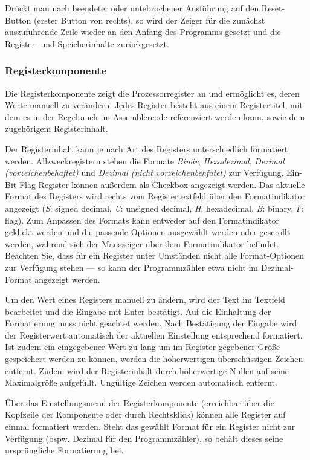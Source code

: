 Drückt man nach beendeter oder untebrochener Ausführung auf den Reset-Button (erster
Button von rechts), so wird der Zeiger für die zunächst auszuführende Zeile wieder
an den Anfang des Programms gesetzt und die Register- und Speicherinhalte zurückgesetzt.



\subsubsection{Registerkomponente}
Die Registerkomponente zeigt die Prozessorregister an und ermöglicht es, deren Werte manuell zu verändern. Jedes Register besteht aus einem Registertitel, mit dem es in der Regel auch im Assemblercode referenziert werden kann, sowie dem zugehörigem Registerinhalt.

Der Registerinhalt kann je nach Art des Registers unterschiedlich formatiert werden. Allzweckregistern stehen die Formate \textit{Binär}, \textit{Hexadezimal}, \textit{Dezimal (vorzeichenbehaftet)} und \textit{Dezimal (nicht vorzeichenbehfatet)} zur Verfügung. Ein-Bit Flag-Register können außerdem als Checkbox angezeigt werden.
Das aktuelle Format des Registers wird rechts vom Registertextfeld über den Formatindikator angezeigt (\textit{S}: signed decimal, \textit{U}: unsigned decimal, \textit{H}: hexadecimal, \textit{B}: binary, \textit{F}: flag). Zum Anpassen des Formats kann entweder auf den Formatindikator geklickt werden und die passende Optionen ausgewählt werden oder gescrollt werden, während sich der Mauszeiger über dem Formatindikator befindet. Beachten Sie, dass für ein Register unter Umständen nicht alle Format-Optionen zur Verfügung stehen --- so kann der Programmzähler etwa nicht im Dezimal-Format angezeigt werden.

Um den Wert eines Registers manuell zu ändern, wird der Text im Textfeld bearbeitet und die Eingabe mit Enter bestätigt. Auf die Einhaltung der Formatierung muss nicht geachtet werden. Nach Bestätigung der Eingabe wird der Registerwert automatisch der aktuellen Einstellung entsprechend formatiert. Ist zudem ein eingegebener Wert zu lang um im Register gegebener Größe gespeichert werden zu können, werden die höherwertigen überschüssigen Zeichen entfernt. Zudem wird der Registerinhalt durch höherwertige Nullen auf seine Maximalgröße aufgefüllt. Ungültige Zeichen werden automatisch entfernt.

Über das Einstellungsmenü der Registerkomponente (erreichbar über die Kopfzeile der Komponente oder durch Rechtsklick) können alle Register auf einmal formatiert werden. Steht das gewählt Format für ein Register nicht zur Verfügung (bspw. Dezimal für den Programmzähler), so behält dieses seine ursprüngliche Formatierung bei.

